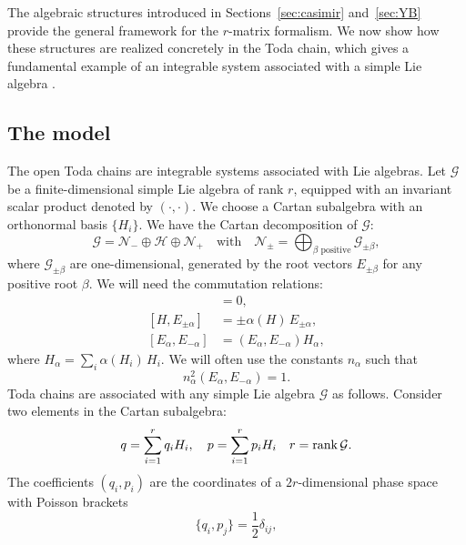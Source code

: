 The algebraic structures introduced in Sections~\ref{sec:casimir} and~\ref{sec:YB}
provide the general framework for the $r$-matrix formalism.
We now show how these structures are realized concretely in the Toda chain, which gives a fundamental example of an integrable system associated with a simple Lie algebra \cite{toda1967vibration,Olshanetsky1979,KOSTANT1979195,perelomov1990integrable}.
\subsection{The model}\label{subsec:The model}
The open Toda chains are integrable systems associated with Lie algebras.
Let $\mathcal{G}$ be a finite-dimensional simple Lie algebra of rank $r$, equipped with an invariant scalar product denoted by $( \cdot, \cdot )$. We choose a Cartan subalgebra with an orthonormal basis $\{H_i\}$. We have the Cartan decomposition of $\mathcal{G}$:
\begin{equation}
    \mathcal{G} = \mathcal{N}_{-} \oplus \mathcal{H} \oplus \mathcal{N}_{+} \quad \text{with} \quad \mathcal{N}_{\pm} = \bigoplus_{\beta \text{ positive}} \mathcal{G}_{\pm \beta},
\end{equation}
where $\mathcal{G}_{\pm \beta}$ are one-dimensional, generated by the root vectors $E_{\pm \beta}$ for any positive root $\beta$.
We will need the commutation relations:
\begin{align}
    [H_i, H_j] &= 0, \\
    [H, E_{\pm \alpha}] &= \pm \alpha(H) \, E_{\pm \alpha}, \\
    [E_{\alpha}, E_{-\alpha}] &= ( E_{\alpha}, E_{-\alpha} ) H_\alpha,
\end{align}
where $H_{\alpha} = \sum_i \alpha(H_i) \, H_i$. We will often use the constants $n_\alpha$ such that 
\begin{equation}
    n_\alpha^2 ( E_{\alpha},E_{-\alpha} ) = 1.
\end{equation}
Toda chains are associated with any simple Lie algebra $\mathcal{G}$ as follows. Consider two elements in the Cartan subalgebra:
\begin{equation}
    q = \sum_{i = 1}^r q_i H_i, \quad p = \sum_{i = 1}^r p_i H_i \quad r = \rank \mathcal{G}.
\end{equation}
The coefficients $(q_i, p_i)$ are the coordinates of a $2r$-dimensional phase space with Poisson brackets 
\begin{equation}\label{eq:poison_bis}
    \{q_i, p_j\} = \frac{1}{2} \delta_{ij},
\end{equation}
